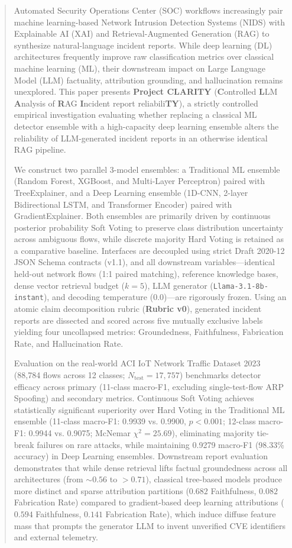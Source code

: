 \documentclass[conference]{IEEEtran}
\begin{document}
\begin{abstract}
Automated Security Operations Center (SOC) workflows increasingly pair machine learning-based Network Intrusion Detection Systems (NIDS) with Explainable AI (XAI) and Retrieval-Augmented Generation (RAG) to synthesize natural-language incident reports. While deep learning (DL) architectures frequently improve raw classification metrics over classical machine learning (ML), their downstream impact on Large Language Model (LLM) factuality, attribution grounding, and hallucination remains unexplored. This paper presents \textbf{Project CLARITY} (\textbf{C}ontrolled \textbf{L}LM \textbf{A}nalysis of \textbf{R}AG \textbf{I}ncident report reliabili\textbf{TY}), a strictly controlled empirical investigation evaluating whether replacing a classical ML detector ensemble with a high-capacity deep learning ensemble alters the reliability of LLM-generated incident reports in an otherwise identical RAG pipeline.

We construct two parallel 3-model ensembles: a Traditional ML ensemble (Random Forest, XGBoost, and Multi-Layer Perceptron) paired with TreeExplainer, and a Deep Learning ensemble (1D-CNN, 2-layer Bidirectional LSTM, and Transformer Encoder) paired with GradientExplainer. Both ensembles are primarily driven by continuous posterior probability Soft Voting to preserve class distribution uncertainty across ambiguous flows, while discrete majority Hard Voting is retained as a comparative baseline. Interfaces are decoupled using strict Draft 2020-12 JSON Schema contracts (v1.1), and all downstream variables---identical held-out network flows (1:1 paired matching), reference knowledge bases, dense vector retrieval budget ($k=5$), LLM generator (\texttt{Llama-3.1-8b-instant}), and decoding temperature ($0.0$)---are rigorously frozen. Using an atomic claim decomposition rubric (\textbf{Rubric v0}), generated incident reports are dissected and scored across five mutually exclusive labels yielding four uncollapsed metrics: Groundedness, Faithfulness, Fabrication Rate, and Hallucination Rate. 

Evaluation on the real-world ACI IoT Network Traffic Dataset 2023 (88,784 flows across 12 classes; $N_{\text{test}} = 17,757$) benchmarks detector efficacy across primary (11-class macro-F1, excluding single-test-flow ARP Spoofing) and secondary metrics. Continuous Soft Voting achieves statistically significant superiority over Hard Voting in the Traditional ML ensemble (11-class macro-F1: 0.9939 vs. 0.9900, $p < 0.001$; 12-class macro-F1: 0.9944 vs. 0.9075; McNemar $\chi^2 = 25.69$), eliminating majority tie-break failures on rare attacks, while maintaining 0.9279 macro-F1 (98.33\% accuracy) in Deep Learning ensembles. Downstream report evaluation demonstrates that while dense retrieval lifts factual groundedness across all architectures (from $\sim 0.56$ to $>0.71$), classical tree-based models produce more distinct and sparse attribution partitions ($0.682$ Faithfulness, $0.082$ Fabrication Rate) compared to gradient-based deep learning attributions ($0.594$ Faithfulness, $0.141$ Fabrication Rate), which induce diffuse feature mass that prompts the generator LLM to invent unverified CVE identifiers and external telemetry.
\end{abstract}
\end{document}
